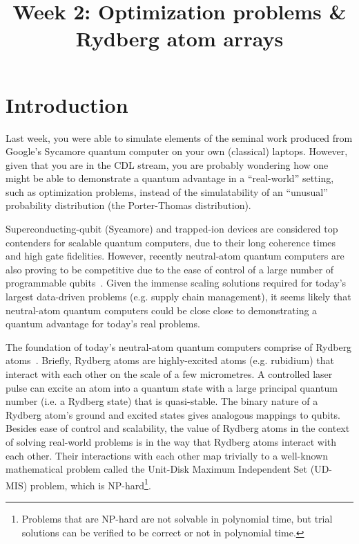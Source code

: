 \documentclass[12pt]{article}
\title{Week 2: Optimization problems \& Rydberg atom arrays}
\author{}
\date{}
\begin{document}
\maketitle

\thispagestyle{empty}

\section*{Introduction}

Last week, you were able to simulate elements of the seminal work produced from Google's Sycamore quantum computer on your own (classical) laptops.
However, given that you are in the CDL stream, you are probably wondering how one might be able to demonstrate a quantum advantage in a ``real-world'' setting, such as optimization problems, instead of the simulatability of an ``unusual'' probability distribution (the Porter-Thomas distribution).

Superconducting-qubit (Sycamore) and trapped-ion devices are considered top contenders for scalable quantum computers, due to their long coherence times and
high gate fidelities.  However, recently neutral-atom quantum computers are also proving to be competitive due to the ease of control of a large number of programmable
qubits~\cite{serret_solving_2020,bernien_probing_2017,ebadi_quantum_2020,henriet_quantum_2020,Browaeys2020}.
Given the immense scaling solutions required for today's largest data-driven problems (e.g. supply chain management), it seems 
likely that neutral-atom quantum computers could be close close to demonstrating a quantum advantage for today's real problems.

The foundation of today's neutral-atom quantum computers comprise of Rydberg atoms~\cite{Browaeys2020}.
Briefly, Rydberg atoms are highly-excited atoms (e.g. rubidium) that interact with each other on the scale of a few micrometres.
A controlled laser pulse can excite an atom into a quantum state with a large principal quantum number (i.e. a Rydberg state) that is quasi-stable.
The binary nature of a Rydberg atom's ground and excited states gives analogous mappings to qubits.
Besides ease of control and scalability, the value of Rydberg atoms in the context of solving real-world problems is in the way that Rydberg atoms interact with each other. 
Their interactions with each other map trivially to a well-known mathematical problem called the Unit-Disk Maximum Independent Set (UD-MIS) problem, which is NP-hard\footnote{Problems that are NP-hard are not solvable in polynomial time, but trial solutions can be verified to be correct or not in polynomial time.}.
\end{document}
